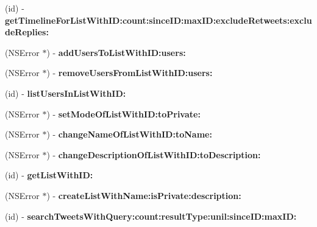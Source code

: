 \begin{DoxyCompactItemize}
(id) -\/ {\bfseries get\+Timeline\+For\+List\+With\+I\+D\+:count\+:since\+I\+D\+:max\+I\+D\+:exclude\+Retweets\+:exclude\+Replies\+:}
\item 
\mbox{\label{interfaceFHSTwitterEngine_a82fe896d7579822d76b5f5f83da46fac}} 
(N\+S\+Error $\ast$) -\/ {\bfseries add\+Users\+To\+List\+With\+I\+D\+:users\+:}
\item 
\mbox{\label{interfaceFHSTwitterEngine_a4d43aa6776be74ef68c5232aee8bee0e}} 
(N\+S\+Error $\ast$) -\/ {\bfseries remove\+Users\+From\+List\+With\+I\+D\+:users\+:}
\item 
\mbox{\label{interfaceFHSTwitterEngine_a766c27d100ae208a80dd510912e9306f}} 
(id) -\/ {\bfseries list\+Users\+In\+List\+With\+I\+D\+:}
\item 
\mbox{\label{interfaceFHSTwitterEngine_ae11db18f3718d03e871b2407e3d9f854}} 
(N\+S\+Error $\ast$) -\/ {\bfseries set\+Mode\+Of\+List\+With\+I\+D\+:to\+Private\+:}
\item 
\mbox{\label{interfaceFHSTwitterEngine_a64f53b7862391c43954443ecabfef3a1}} 
(N\+S\+Error $\ast$) -\/ {\bfseries change\+Name\+Of\+List\+With\+I\+D\+:to\+Name\+:}
\item 
\mbox{\label{interfaceFHSTwitterEngine_a92f27a62c5282ec391b93f2ba8edb8b3}} 
(N\+S\+Error $\ast$) -\/ {\bfseries change\+Description\+Of\+List\+With\+I\+D\+:to\+Description\+:}
\item 
\mbox{\label{interfaceFHSTwitterEngine_a227a9e63b6916abc7789a0e1502fa2d7}} 
(id) -\/ {\bfseries get\+List\+With\+I\+D\+:}
\item 
\mbox{\label{interfaceFHSTwitterEngine_a1ebcc14c00d2481303ab83da36e962a5}} 
(N\+S\+Error $\ast$) -\/ {\bfseries create\+List\+With\+Name\+:is\+Private\+:description\+:}
\item 
\mbox{\label{interfaceFHSTwitterEngine_ac1154bd01ac1f4d6347c22f6ffa4ba6d}} 
(id) -\/ {\bfseries search\+Tweets\+With\+Query\+:count\+:result\+Type\+:unil\+:since\+I\+D\+:max\+I\+D\+:}

\end{DoxyCompactItemize}
